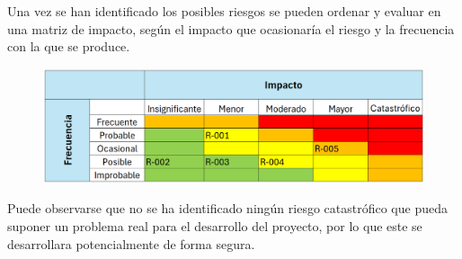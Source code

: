 Una vez se han identificado los posibles riesgos se pueden ordenar y evaluar en una matriz de impacto, según el impacto que ocasionaría el riesgo y la frecuencia con la que se produce.

\begin{figure}[H]
    \centering
    \includegraphics[width=1\textwidth]{tables/matrizImpacto.png}
    \label{table:matrizImpacto}
\end{figure}

Puede observarse que no se ha identificado ningún riesgo catastrófico que pueda suponer un problema real para el desarrollo del proyecto, por lo que este se desarrollara potencialmente de forma segura.